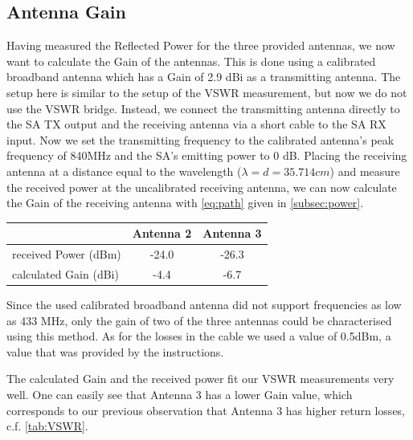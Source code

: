 \subsection{Antenna Gain}
Having measured the Reflected Power for the three provided antennas, we now want to calculate the Gain of the antennas. This is done using a calibrated broadband antenna which has a Gain of 2.9 dBi as a transmitting antenna. The setup here is similar to the setup of the VSWR measurement, but now we do not use the VSWR bridge. Instead, we connect the transmitting antenna directly to the SA TX output and the receiving antenna via a short cable to the SA RX input. Now we set the transmitting frequency to the calibrated antenna's peak frequency of 840MHz and the SA's emitting power to 0 dB. Placing the receiving antenna at a distance equal to the wavelength ($\lambda = d = 35.714cm$) and measure the received power at the uncalibrated receiving antenna, we can now calculate the Gain of the receiving antenna with \cref{eq:path} given in \cref{subsec:power}.

\begin{center}
	\begin{tabular}{l | c | c}
		& Antenna 2 & Antenna 3 \\ \hline
		received Power (dBm) & -24.0 &  -26.3\\ \hline
		calculated Gain (dBi) & -4.4 & -6.7 \\
	\end{tabular}
	\label{tab:gain}
\end{center}
Since the used calibrated broadband antenna did not support frequencies as low as 433 MHz, only the gain of two of the three antennas could be characterised using this method.
As for the losses in the cable we used a value of 0.5dBm, a value that was provided by the instructions.

The calculated Gain and the received power fit our VSWR measurements very well. One can easily see that Antenna 3 has a lower Gain value, which corresponds to our previous observation that Antenna 3 has higher return losses, c.f. \cref{tab:VSWR}.


